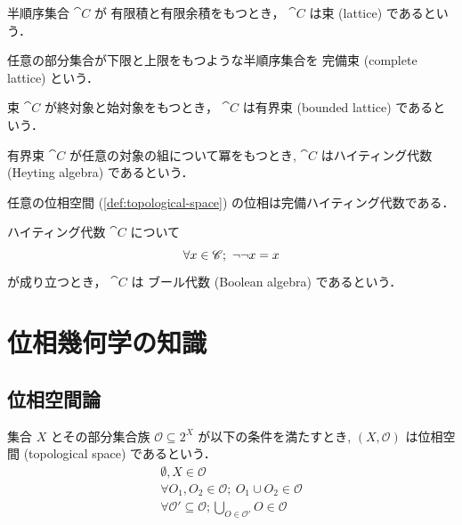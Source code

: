 \documentclass[titlepage]{ltjsreport}
\newtheorem[S]{theorem}{定理}[chapter]
\newtheorem[S]{definition}[theorem]{定義}
\newtheorem[S]{example}[theorem]{例}
\begin{document}
\begin{definition}[束]
  半順序集合 $\cat{C}$ が
  有限積と有限余積をもつとき，
  $\cat{C}$ は束 (lattice) であるという．
\end{definition}

\begin{definition}[完備束]\label{def:complete-lattice}%
  任意の部分集合が下限と上限をもつような半順序集合を
  完備束
  (complete lattice)
  という．
\end{definition}

\begin{definition}[有界束]
  束 $\cat{C}$ が終対象と始対象をもつとき，
  $\cat{C}$ は有界束 (bounded lattice) であるという．
\end{definition}

\begin{definition}[ハイティング代数]\label{def:heyting-algebra}%
  有界束 $\cat{C}$ が任意の対象の組について冪をもつとき,
  $\cat{C}$ はハイティング代数 (Heyting algebra) であるという．
\end{definition}

\begin{theorem}
  任意の位相空間 (\cref{def:topological-space})
  の位相は完備ハイティング代数である．
\end{theorem}

\begin{definition}[ブール代数]\label{def:boolean-algebra}
  ハイティング代数 $\cat{C}$ について
  \begin{equation}
    \forall x\in\obj{\cat{C}};\ \neg\neg x=x
  \end{equation}
  が成り立つとき，
  $\cat{C}$ は ブール代数 (Boolean algebra) であるという．
\end{definition}

\chapter{位相幾何学の知識}

\section{位相空間論}

\begin{definition}[位相空間]\label{def:topological-space}
  集合 $X$ とその部分集合族 $\mathcal{O}\subseteq2^X$ が以下の条件を満たすとき,
  $(X,\mathcal{O})$ は位相空間 (topological space) であるという．
  \begin{align}
    \emptyset,X\in\mathcal{O}                                 \\
    \forall O_1,O_2\in\mathcal{O};\ O_1\cup O_2\in\mathcal{O} \\
    \forall \mathcal{O}'\subseteq\mathcal{O};
    \bigcup_{O\in\mathcal{O}'}O\in\mathcal{O}
  \end{align}
\end{definition}
\end{document}
